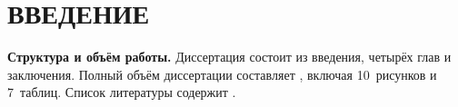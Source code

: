 \chapter*{ВВЕДЕНИЕ}

\newcommand{\actuality}{\textbf{Актуальность темы.}\enspace\ignorespaces}
\newcommand{\aim}{\textbf{Цель работы.}\enspace\ignorespaces}
\newcommand{\tasks}{\textbf{Задачи работы.}\enspace\ignorespaces}
\newcommand{\novelty}{\textbf{Научная новизна.}\enspace\ignorespaces}
\newcommand{\influence}{\textbf{Теоретическая и практическая значимость.}\enspace\ignorespaces}
\newcommand{\methods}{\textbf{Методы и инструменты исследования.}\enspace\ignorespaces}
\newcommand{\defpositions}{\textbf{Основные положения, выносимые на защиту.}\enspace\ignorespaces}
\newcommand{\relevance}{\textbf{Соответствие специальности.}\enspace\ignorespaces}
\newcommand{\reliability}{\textbf{Достоверность результатов проведённых исследований.}\enspace\ignorespaces}
\newcommand{\probation}{\textbf{Апробация работы.}\enspace\ignorespaces}
\newcommand{\contribution}{\textbf{Личный вклад автора.}\enspace\ignorespaces}
\newcommand{\publications}{\textbf{Публикации по теме диссертации.}\enspace\ignorespaces}
\newcommand{\structure}{\textbf{Структура и объём работы.}\enspace\ignorespaces}



\structure
%
%
Диссертация состоит из введения, четырёх глав и заключения.
Полный объём диссертации составляет , включая 10~рисунков и 7~таблиц.
Список литературы содержит .
